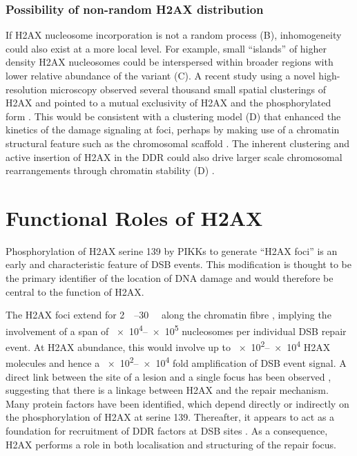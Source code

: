\subsubsection{Possibility of non-random H2AX distribution}
If H2AX nucleosome incorporation is not a random process (B),
inhomogeneity could also exist at a more local level. For example, small ``islands'' of higher
density H2AX nucleosomes could be interspersed within broader regions with lower relative abundance
of the variant (C). A recent study using a novel high-resolution
microscopy observed several thousand small spatial clusterings of H2AX and pointed to a mutual
exclusivity of H2AX and the phosphorylated form \citep{JBBTB06}. This would be consistent with a
clustering model (D) that enhanced the kinetics of the damage
signaling at foci, perhaps by making use of a chromatin structural feature such as the chromosomal
scaffold \citep{JBBTB06}. The inherent clustering and active insertion of H2AX in the DDR could also
drive larger scale chromosomal rearrangements through chromatin stability (D) \citep{KHHK+08}.

\section{Functional Roles of H2AX}
Phosphorylation of H2AX serine 139 by PIKKs to generate ``\textgamma H2AX foci'' is an early and
characteristic feature of DSB events. This modification is thought to be the primary identifier of
the location of DNA damage and would therefore be central to the function of H2AX.

The \textgamma H2AX foci extend for \SIrange{2}{30}{\mega\bp} along the chromatin fibre \citep{EPR+99}, implying the
involvement of a span of \numrange{e4}{e5} nucleosomes per individual DSB repair event. At  H2AX
abundance, this would involve up to \numrange{e2}{e4} H2AX molecules and hence a \numrange{e2}{e4} fold
amplification of DSB event signal. A direct link between the site of a lesion and a single focus has
been observed \citep{KRIK+03}, suggesting that there is a linkage between \textgamma H2AX and the repair
mechanism. Many protein factors have been identified, which depend directly or indirectly on the
phosphorylation of H2AX at serine 139. Thereafter, it appears to act as a foundation for recruitment
of DDR factors at DSB sites \citep{TTP+00}. As a consequence, H2AX performs a role in both localisation
and structuring of the repair focus.

